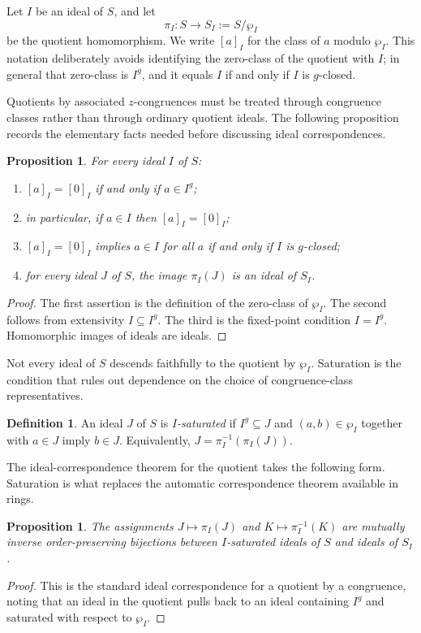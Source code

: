 \documentclass[11pt,leqno]{amsart}
\theoremstyle{plain}
\newtheorem{proposition}[theorem]{Proposition}
\theoremstyle{definition}
\newtheorem{definition}{Definition}[section]
\theoremstyle{remark}
\numberwithin{equation}{section}
\begin{document}
Let $I$ be an ideal of $S$, and let
\[
\pi_I:S\longrightarrow S_I:=S/\wp_I
\]
be the quotient homomorphism.
We write $[a]_I$ for the class of $a$ modulo $\wp_I$.
This notation deliberately avoids identifying the zero-class of
the quotient with $I$; in general that zero-class is $I^g$,
and it equals $I$ if and only if $I$ is $g$-closed.

Quotients by associated $z$-congruences must be treated through
congruence classes rather than through ordinary quotient ideals.
The following proposition records the elementary facts needed before
discussing ideal correspondences.

\begin{proposition}\label{prop:quotient-basic}
For every ideal $I$ of $S$:
\begin{enumerate}
\item $[a]_I=[0]_I$ if and only if $a\in I^g$;
\item in particular, if $a\in I$ then $[a]_I=[0]_I$;
\item $[a]_I=[0]_I$ implies $a\in I$ for all $a$ if and only if
  $I$ is $g$-closed;
\item for every ideal $J$ of $S$, the image $\pi_I(J)$ is an ideal
  of $S_I$.
\end{enumerate}
\end{proposition}
\begin{proof}
The first assertion is the definition of the zero-class of $\wp_I$.
The second follows from extensivity $I\subseteq I^g$.
The third is the fixed-point condition $I=I^g$.
Homomorphic images of ideals are ideals.
\end{proof}

Not every ideal of $S$ descends faithfully to the quotient by $\wp_I$.
Saturation is the condition that rules out dependence on the choice
of congruence-class representatives.

\begin{definition}\label{def:I-saturated}
An ideal $J$ of $S$ is \emph{$I$-saturated} if $I^g\subseteq J$ and
$(a,b)\in\wp_I$ together with $a\in J$ imply $b\in J$.
Equivalently, $J=\pi_I^{-1}(\pi_I(J))$.
\end{definition}

The ideal-correspondence theorem for the quotient takes the
following form.
Saturation is what replaces the automatic correspondence theorem
available in rings.

\begin{proposition}\label{prop:quotient-ideal-correspondence}
The assignments $J\mapsto\pi_I(J)$ and $K\mapsto\pi_I^{-1}(K)$
are mutually inverse order-preserving bijections between
$I$-saturated ideals of $S$ and ideals of $S_I$.
\end{proposition}
\begin{proof}
This is the standard ideal correspondence for a quotient by a
congruence, noting that an ideal in the quotient pulls back to an
ideal containing $I^g$ and saturated with respect to $\wp_I$.
\end{proof}
\end{document}
